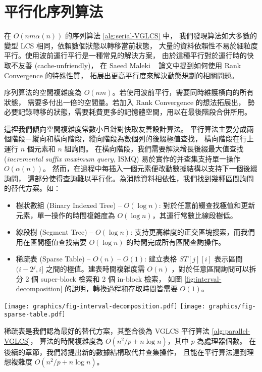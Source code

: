 \section{平行化序列算法} %
\label{sec:parallelSerial}

在 $O(nm \alpha(n))$ 的序列算法 \ref{alg:serial-VGLCS} 中，
我們發現算法如大多數的變型 LCS 相同，依賴數個狀態以轉移當前狀態，
大量的資料依賴性不易於細粒度平行。使用波前運行平行是一種常見的解決方案，
由於這種平行對於運行時的快取不友善 (cache-unfriendly)，
在 Saeed Maleki ~\cite{saeed} 論文中提到如何使用 Rank Convergence 的特殊性質，
拓展出更高平行度來解決動態規劃的相關問題。



序列算法的空間複雜度為 $O(nm)$。若使用波前平行，需要同時維護橫向的所有狀態，
需要多付出一倍的空間量。若加入 Rank Convergence 的想法拓展出，
勢必要記錄轉移的狀態，需要耗費更多的記憶體空間，用以在最後階段合併所用。

這裡我們傾向空間複雜度常數小且針對快取友善設計算法。
平行算法主要分成兩個階段－縱向和橫向階段，縱向階段為數個列的後綴極值查找，
橫向階段在行上運行 $n$ 個元素和 $n$ 組詢問。
在橫向階段，我們需要解決增長後綴最大值查找 (\emph{incremental suffix maximum query}, ISMQ)
易於實作的并查集支持單一操作 $O(\alpha(n))$。
然而，在過程中每插入一個元素便改動數據結構以支持下一個後綴詢問，
這部分使得查詢難以平行化。為消除資料相依性，我們找到幾種區間詢問的替代方案。如：

\begin{itemize}
  \item 樹狀數組 (Binary Indexed Tree) -- $O(\log n)$: 對於任意前綴查找極值和更新元素，單一操作的時間複雜度為 $O(\log n)$，其運行常數比線段樹低。
  \item 線段樹 (Segment Tree) -- $O(\log n)$: 支持更高維度的正交區塊搜索，而我們用在區間極值查找需要 $O(\log n)$ 的時間完成所有區間查詢操作。
  \item 稀疏表 (Sparse Table) -- $O(n)$ -- $O(1)$:
    建立表格 $ST[j][i]$ 表示區間 $(i-2^j,i]$ 之間的極值。建表時間複雜度需 $O(n)$
    ，對於任意區間詢問可以拆分 2 個 super-block 檢索和 2 個 in-block 檢索，
    如圖 \ref{fig:interval-decomposition} 的說明，轉換過程和存取時間皆需要 $O(1)$。
\end{itemize}

\begin{figure*}[!thb]
  \centering
  \texttt{[image: graphics/fig-interval-decomposition.pdf]}
  \texttt{[image: graphics/fig-sparse-table.pdf]}
  \caption{給定一陣列 $A$ 如上圖所述，並且拆成 5 個區塊，每個區塊皆有 4 個元素，
  若詢問區間 $[2, 18]$ 的最大值，將分成 $B1$ 的內部詢問 (in-block query) $Q_L$、
  $B5$ 的內部詢問 $Q_R$ 和兩個跨區間詢問 (super-block query) $SQ_L$、$SQ_R$}
  \label{fig:interval-decomposition}
\end{figure*}

稀疏表是我們認為最好的替代方案，其整合後為 VGLCS 平行算法 \ref{alg:parallel-VGLCS}，
算法的時間複雜度為 $O(n^2 / p + n \log n)$，其中 $p$ 為處理器個數。
在後續的章節，我們將提出新的數據結構取代并查集操作，
且能在平行算法達到理想複雜度 $O(n^2 / p + n \log n)$。

